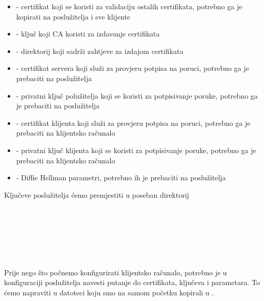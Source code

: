         \begin{itemize}
        \item {} - certifikat koji se koristi za validaciju ostalih
        certifikata, potrebno ga je kopirati na poslužitelja i sve klijente
        \item {} - ključ koji CA koristi za izdavanje certifikata
        \item {} - direktorij koji sadrži zahtjeve za izdajom
        certifikata 
        \item {} - certifikat servera koji služi za
        provjeru potpisa na poruci, potrebno ga je prebaciti na poslužitelja
        \item {} - privatni ključ polužitelja
        koji se koristi za potpisivanje poruke, potrebno ga je prebaciti na
        poslužitelja
        \item {} - certifikat klijenta koji služi za
        provjeru potpisa na poruci, potrebno ga je prebaciti na klijentsko
        računalo
        \item {} - privatni ključ klijenta
        koji se koristi za potpisivanje poruke, potrebno ga je prebaciti na
        klijentsko računalo
        \item {} - Diffie Hellman parametri, potrebno ih je prebaciti na
        poslužitelja
        \end{itemize}

        Ključeve poslužitelja ćemo premjestiti u poseban direktorij

        \noindent
         \\
         \\
         \\
         \\
         \\
         \\

        \noindent
        Prije nego što počnemo konfigurirati klijentsko računalo, potrebno je u
        konfiguraciji poslužitelja navesti putanje do certifikata, ključeva i 
        parametara. To ćemo napraviti u datoteci  koju smo
        na samom početku kopirali u .
        
